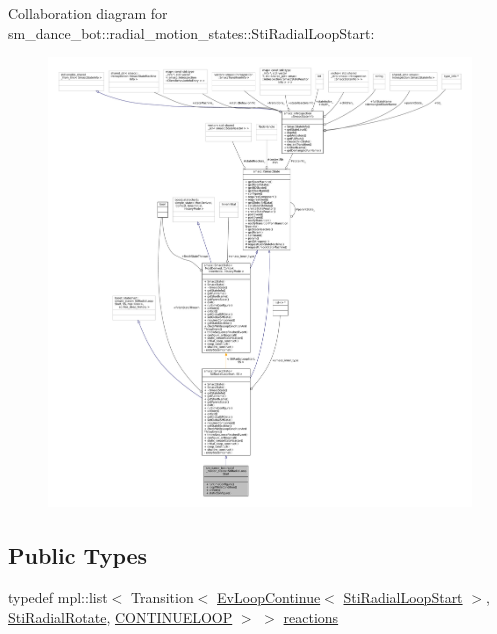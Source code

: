 Collaboration diagram for sm\+\_\+dance\+\_\+bot\+:\+:radial\+\_\+motion\+\_\+states\+:\+:Sti\+Radial\+Loop\+Start\+:
\nopagebreak
\begin{figure}[H]
\begin{center}
\leavevmode
\includegraphics[width=350pt]{structsm__dance__bot_1_1radial__motion__states_1_1StiRadialLoopStart__coll__graph}
\end{center}
\end{figure}
\subsection*{Public Types}
\begin{DoxyCompactItemize}
\item 
typedef mpl\+::list$<$ Transition$<$ \hyperlink{structsmacc_1_1default__events_1_1EvLoopContinue}{Ev\+Loop\+Continue}$<$ \hyperlink{structsm__dance__bot_1_1radial__motion__states_1_1StiRadialLoopStart}{Sti\+Radial\+Loop\+Start} $>$, \hyperlink{structsm__dance__bot_1_1radial__motion__states_1_1StiRadialRotate}{Sti\+Radial\+Rotate}, \hyperlink{structsmacc_1_1default__transition__tags_1_1CONTINUELOOP}{C\+O\+N\+T\+I\+N\+U\+E\+L\+O\+OP} $>$ $>$ \hyperlink{structsm__dance__bot_1_1radial__motion__states_1_1StiRadialLoopStart_a817d8c91080ccf4ff0f387455d26f94c}{reactions}
\end{DoxyCompactItemize}
